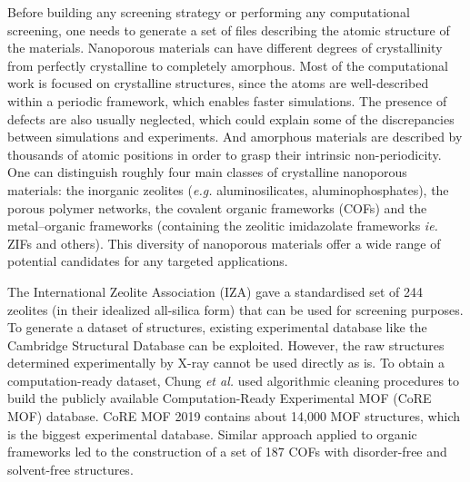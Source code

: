 \documentclass[main.tex]{subfiles}
\begin{document}
Before building any screening strategy or performing any computational screening, one needs to generate a set of files describing the atomic structure of the materials. Nanoporous materials can have different degrees of crystallinity from perfectly crystalline to completely amorphous. Most of the computational work is focused on crystalline structures, since the atoms are well-described within a periodic framework, which enables faster simulations. The presence of defects are also usually neglected, which could explain some of the discrepancies between simulations and experiments. And amorphous materials are described by thousands of atomic positions in order to grasp their intrinsic non-periodicity.\cite{Thyagarajan_2020} One can distinguish roughly four main classes of crystalline nanoporous materials: the inorganic zeolites (\emph{e.g.} aluminosilicates, aluminophosphates), the porous polymer networks, the covalent organic frameworks (COFs) and the metal--organic frameworks (containing the zeolitic imidazolate frameworks \emph{ie.} ZIFs and others). This diversity of nanoporous materials offer a wide range of potential candidates for any targeted applications.

The International Zeolite Association (IZA) gave a standardised set of 244 zeolites (in their idealized all-silica form) that can be used for screening purposes. To generate a dataset of structures, existing experimental database like the Cambridge Structural Database can be exploited. However, the raw structures determined experimentally by X-ray cannot be used directly as is. To obtain a computation-ready dataset, Chung \emph{et al.} used algorithmic cleaning procedures to build the publicly available Computation-Ready Experimental MOF (CoRE MOF) database.\cite{Chung_2014, Chung_2019} CoRE MOF 2019 contains about 14,000 MOF structures, which is the biggest experimental database. Similar approach applied to organic frameworks led to the construction of a set of 187 COFs with disorder-free and solvent-free structures.\cite{Tong_2017,Ongari_2019}
\end{document}
